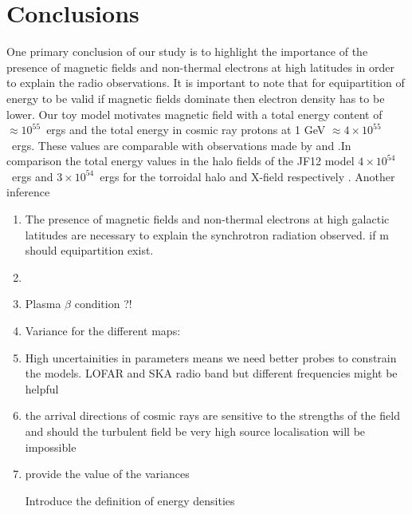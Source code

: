 \documentclass[usenatbib]{mnras}
\newcommand{\Vasu}[1]{{\color{purple}#1}}
\begin{document}
\section{Conclusions}
\label{Conclusions}
One primary conclusion of our study is to highlight the importance of the presence of magnetic fields and non-thermal electrons at high latitudes in order to explain the radio observations. It is important to note that for equipartition of energy to be valid if magnetic fields dominate then electron density has to be lower.
Our toy model motivates magnetic field with a total energy content of $\approx 10^{55}$~ergs and the total energy in cosmic ray protons at 1 GeV $\approx 4\times 10^{55}$~ergs. These values are comparable with observations made by \cite{Su_2010} and \cite{eROSITA}.In comparison the total energy values in the halo fields of the JF12 model $4\times 10^{54}$~ergs and $3\times  10^{54}$~ergs for the torroidal halo and X-field respectively \cite{Taylor_2019}.
Another inference 
\begin{enumerate}

    \item The presence of magnetic fields and non-thermal electrons at high galactic latitudes are necessary to explain the synchrotron radiation observed. if m should equipartition exist. %
    \item 
    \item Plasma $\beta$ condition ?! 
    \item Variance for the different maps:
    
    \item High uncertainities in parameters means we need better probes to constrain the models. LOFAR and SKA radio band but different frequencies might be helpful
    \item the arrival directions of cosmic rays are sensitive to the strengths of the field and should 
    the turbulent field be very high source localisation will be impossible
    \item provide the value of the variances
    
    \Vasu{Introduce the definition of energy 
    densities}
    
\end{enumerate}
\end{document}
